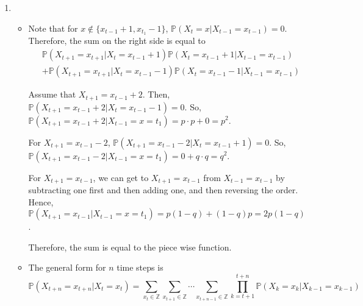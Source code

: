 \documentclass[12pt]{article}
\begin{document}
\begin{enumerate}[start=1,label={\bfseries Problem \arabic*:},leftmargin=1in]
    \item \begin{itemize}
        \item Note that for $x  \not \in \{ x_{t-1} + 1, x_{t_{1}} - 1\}$, $\mathbb{P}(X_{t} = x | X_{t-1} = x_{t-1}) = 0$. 
        Therefore, the sum on the right side is equal to 
        \begin{align*}
            &\mathbb{P}(X_{t+1} = x_{t+1} | X_{t} = x_{t-1} + 1)\mathbb{P}(X_{t} = x_{t-1} + 1 | X_{t-1} = x_{t-1}) \\
            &+ \mathbb{P}(X_{t+1} = x_{t+1} | X_{t} = x_{t-1} - 1)\mathbb{P}(X_{t} = x_{t-1} - 1 | X_{t-1} = x_{t-1})
        \end{align*}
            
        Assume that $X_{t+1} = x_{t-1} + 2$. Then, $\mathbb{P}(X_{t+1} = x_{t-1} + 2| X_{t} = x_{t-1} - 1) = 0$. So, 
        $\mathbb{P}(X_{t+1} = x_{t-1} + 2 | X_{t-1} = x = t_{1}) = p \cdot p + 0 = p^{2}$.  

        For $X_{t+1} = x_{t-1} - 2$, $\mathbb{P}(X_{t+1} = x_{t-1} - 2| X_{t} = x_{t-1} + 1) = 0$. So, 
        $\mathbb{P}(X_{t+1} = x_{t-1} - 2 | X_{t-1} = x = t_{1}) = 0 + q \cdot q = q^{2}$.  


        For $X_{t+1} = x_{t-1}$, we can get to $X_{t+1} = x_{t-1}$ from $X_{t-1} = x_{t-1}$ by subtracting one first and then adding one, and then reversing the order. 
        Hence, $\mathbb{P}(X_{t+1} = x_{t-1} | X_{t-1} = x = t_{1}) = p(1-q) + (1-q)p = 2p(1-q)$. 

        Therefore, the sum is equal to the piece wise function. 

        \item The general form for $n$ time steps is 
        \[
            \mathbb{P}(X_{t+n} = x_{t+n} | X_{t} = x_{t}) = \sum_{x_{t} \in \mathbb{Z}} \sum_{x_{t+1} \in \mathbb{Z}} \cdots \sum_{x_{t+n-1} \in \mathbb{Z}} \prod_{k = t + 1}^{t+n} \mathbb{P}(X_{k} = x_{k}| X_{{k-1}} = x_{k-1} )
        \] 
    \end{itemize}
\end{enumerate}
\end{document}
